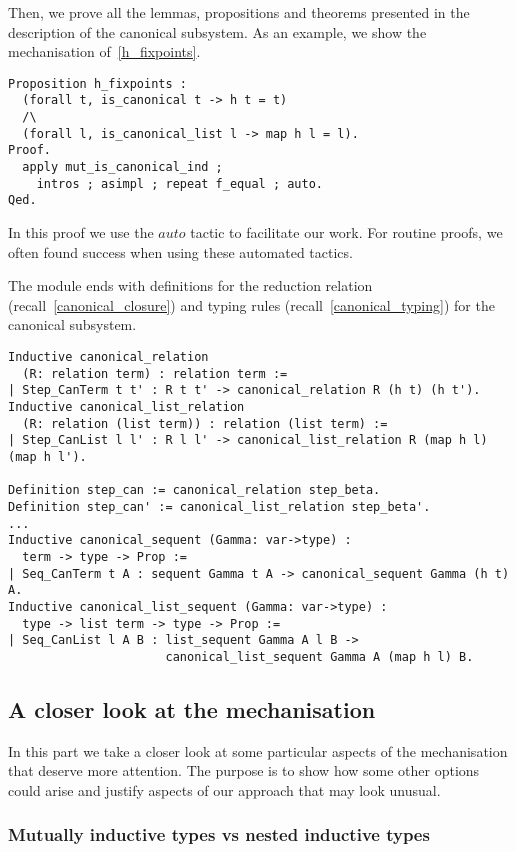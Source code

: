 Then, we prove all the lemmas, propositions and theorems presented in the description of the canonical subsystem.
As an example, we show the mechanisation of~\cref{h_fixpoints}.
\begin{lstlisting}[language=Coq]
Proposition h_fixpoints :
  (forall t, is_canonical t -> h t = t)
  /\
  (forall l, is_canonical_list l -> map h l = l).
Proof.
  apply mut_is_canonical_ind ;
    intros ; asimpl ; repeat f_equal ; auto.
Qed.
\end{lstlisting}
In this proof we use the \lst$auto$ tactic to facilitate our work.
For routine proofs, we often found success when using these automated tactics.

The module ends with definitions for the reduction relation (recall~\cref{canonical_closure}) and typing rules (recall~\cref{canonical_typing}) for the canonical subsystem.
\begin{lstlisting}[language=Coq]
Inductive canonical_relation
  (R: relation term) : relation term :=
| Step_CanTerm t t' : R t t' -> canonical_relation R (h t) (h t').
Inductive canonical_list_relation
  (R: relation (list term)) : relation (list term) :=
| Step_CanList l l' : R l l' -> canonical_list_relation R (map h l) (map h l').

Definition step_can := canonical_relation step_beta.
Definition step_can' := canonical_list_relation step_beta'.
...
Inductive canonical_sequent (Gamma: var->type) :
  term -> type -> Prop :=
| Seq_CanTerm t A : sequent Gamma t A -> canonical_sequent Gamma (h t) A.
Inductive canonical_list_sequent (Gamma: var->type) :
  type -> list term -> type -> Prop :=
| Seq_CanList l A B : list_sequent Gamma A l B ->
                      canonical_list_sequent Gamma A (map h l) B.
\end{lstlisting}

\subsection{A closer look at the mechanisation}

In this part we take a closer look at some particular aspects of the mechanisation that deserve more attention.
The purpose is to show how some other options could arise and justify aspects of our approach that may look unusual.

\subsubsection{Mutually inductive types vs nested inductive types}

